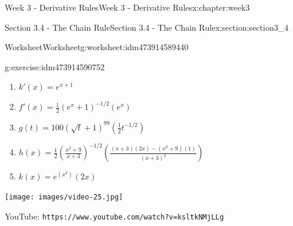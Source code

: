 \documentclass[oneside,10pt,]{book}
\newcommand{\mono}[1]{\texttt{#1}}
\numberwithin{equation}{section}
\newlength{\qrsize}
\newlength{\previewwidth}
\begin{document}
\begin{chapterptx}{Week 3 - Derivative Rules}{}{Week 3 - Derivative Rules}{}{}{x:chapter:week3}
\begin{sectionptx}{Section 3.4 - The Chain Rule}{}{Section 3.4 - The Chain Rule}{}{}{x:section:section3_4}
\begin{worksheet-subsection}{Worksheet}{}{Worksheet}{}{}{g:worksheet:idm473914589440}
\begin{divisionexercise}{1}{}{}{g:exercise:idm473914590752}
\begin{enumerate}[label=(\alph*)]
\item{}\(\displaystyle k'(x) = e^{x+1}\)%
\item{}\(\displaystyle f'(x) = \frac 12 (e^x +1)^{-1/2}(e^x)\)%
\item{}\(\displaystyle g(t) = 100(\sqrt{t} + 1)^{99}\left( \frac 12 t^{-1/2} \right)\)%
\item{}\(\displaystyle h(x) = \frac 12 \left( \frac{x^2+9}{x+3} \right) ^{-1/2} \left( \frac{(x+3)(2x)-(x^2+9)(1)}{(x+3)^2} \right)\)%
\item{}\(\displaystyle k(x) = e^{(x^2)} (2x)\)%
\end{enumerate}
\end{divisionexercise}%
\end{worksheet-subsection}
\restoregeometry
\setlength{\qrsize}{9em}
\setlength{\previewwidth}{\linewidth}
\addtolength{\previewwidth}{-\qrsize}
\begin{tcbraster}[raster columns=2, raster column skip=1pt, raster halign=center, raster force size=false, raster left skip=0pt, raster right skip=0pt]%
\begin{tcolorbox}[previewstyle, width=\previewwidth]%
\texttt{[image: images/video-25.jpg]}%
\end{tcolorbox}%
\begin{tcolorbox}[qrstyle]%
{\hypersetup{urlcolor=black}}%
\end{tcolorbox}%
\begin{tcolorbox}[captionstyle]%
\small YouTube: \mono{https://www.youtube.com/watch?v=ksltkNMjLLg}\end{tcolorbox}%
\end{tcbraster}%
\end{sectionptx}
\end{chapterptx}
%
%
\typeout{************************************************}
\typeout{************************************************}
%
\end{document}
